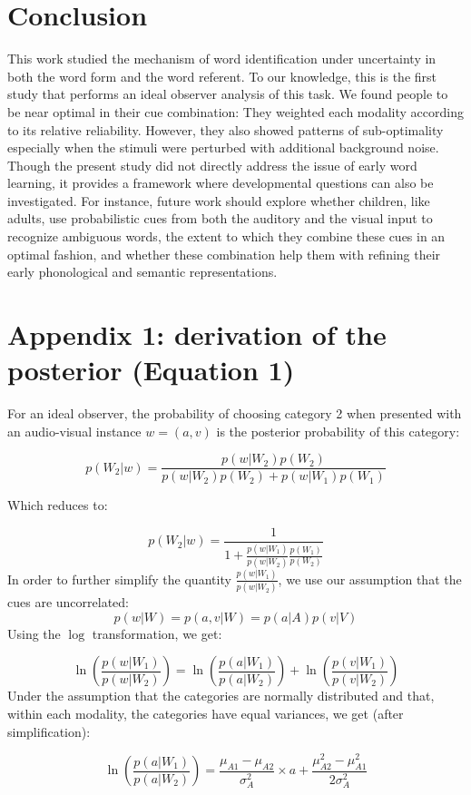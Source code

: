 \documentclass[english,floatsintext,man]{apa6}
\theoremstyle{definition}
\theoremstyle{definition}
\theoremstyle{definition}
\theoremstyle{remark}
\begin{document}
\section{Conclusion}\label{conclusion}

This work studied the mechanism of word identification under uncertainty
in both the word form and the word referent. To our knowledge, this is
the first study that performs an ideal observer analysis of this task.
We found people to be near optimal in their cue combination: They
weighted each modality according to its relative reliability. However,
they also showed patterns of sub-optimality especially when the stimuli
were perturbed with additional background noise. Though the present
study did not directly address the issue of early word learning, it
provides a framework where developmental questions can also be
investigated. For instance, future work should explore whether children,
like adults, use probabilistic cues from both the auditory and the
visual input to recognize ambiguous words, the extent to which they
combine these cues in an optimal fashion, and whether these combination
help them with refining their early phonological and semantic
representations.

\section{Appendix 1: derivation of the posterior (Equation
1)}\label{appendix-1-derivation-of-the-posterior-equation-1}

For an ideal observer, the probability of choosing category 2 when
presented with an audio-visual instance \(w = (a, v)\) is the posterior
probability of this category:

\[p(W_2 | w)=\frac{p(w|W_2)p(W_2)}{p(w|W_2)p(W_2)+p(w|W_1)p(W_1)}\]

Which reduces to:

\[p(W_2 | w)=\frac{1}{1+\frac{p(w|W_1)}{p(w|W_2)} \frac{p(W_1)}{p(W_2)}}\]
In order to further simplify the quantity \(\frac{p(w|W_1)}{p(w|W_2)}\),
we use our assumption that the cues are uncorrelated:
\[p(w | W) = p(a,v| W) = p(a| A)p(v| V)\] Using the \(\log\)
transformation, we get:

\[ \ln(\frac{p(w |W_1)}{p(w|W_2)})=\ln(\frac{p(a|W_1)}{p(a|W_2)})+\ln(\frac{p(v|W_1)}{p(v|W_2)}) \]
Under the assumption that the categories are normally distributed and
that, within each modality, the categories have equal variances, we get
(after simplification):

\[\ln(\frac{p(a|W_1)}{p(a|W_2)})=\frac{\mu_{A1}-\mu_{A2}}{\sigma^2_{A}}\times a+ \frac{\mu^2_{A2}-\mu^2_{A1}}{2\sigma^2_{A}}\]
\end{document}

